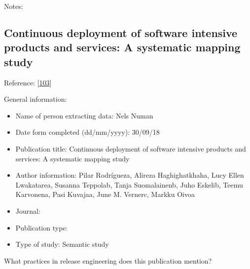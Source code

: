 \documentclass[]{book}
\providecommand{\tightlist}{%
  \setlength{\itemsep}{0pt}\setlength{\parskip}{0pt}}
\begin{document}
Notes:

\subsection{Continuous deployment of software intensive products and
services: A systematic mapping
study}\label{continuous-deployment-of-software-intensive-products-and-services-a-systematic-mapping-study}

Reference: {[}\protect\hyperlink{ref-rodriguez2017a}{103}{]}

General information:

\begin{itemize}
\tightlist
\item
  Name of person extracting data: Nels Numan
\item
  Date form completed (dd/mm/yyyy): 30/09/18
\item
  Publication title: Continuous deployment of software intensive
  products and services: A systematic mapping study
\item
  Author information: Pilar Rodrígueza, Alireza Haghighatkhaha, Lucy
  Ellen Lwakatarea, Susanna Teppolab, Tanja Suomalainenb, Juho Eskelib,
  Teemu Karvonena, Pasi Kuvajaa, June M. Vernerc, Markku Oivoa
\item
  Journal:
\item
  Publication type:
\item
  Type of study: Semantic study
\end{itemize}

What practices in release engineering does this publication mention?
\end{document}
